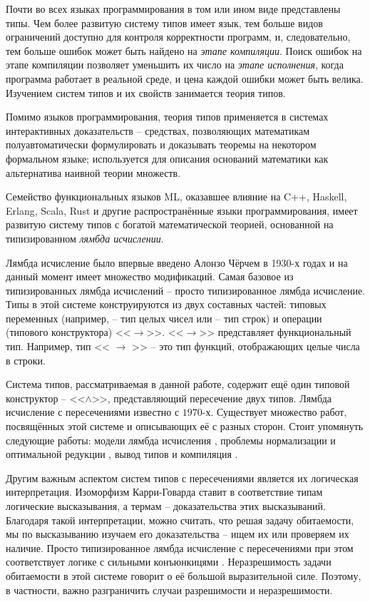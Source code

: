 \documentclass[../main.tex]{subfiles}
\begin{document}
 \label{sec:introduction}

Почти во всех языках программирования в том или ином виде представлены типы. Чем более развитую систему типов имеет язык, тем больше видов ограничений доступно для контроля корректности программ, и, следовательно, тем больше ошибок может быть найдено на {\it этапе компиляции}. Поиск ошибок на этапе компиляции позволяет уменьшить их число на {\it этапе исполнения}, когда программа работает в реальной среде, и цена каждой ошибки может быть велика. Изучением систем типов и их свойств занимается теория типов. 

Помимо языков программирования, теория типов применяется в системах интерактивных доказательств -- средствах, позволяющих математикам полуавтоматически формулировать и доказывать теоремы на некотором формальном языке; используется для описания оснований математики как альтернатива наивной теории множеств.

\emptyline

Семейство функциональных языков ML, оказавшее влияние на C++, Haskell, Erlang, Scala, Rust и другие распространённые языки программирования, имеет развитую систему типов с богатой математической теорией, основанной на типизированном {\it лямбда исчислении}.

Лямбда исчисление было впервые введено Алонзо Чёрчем в 1930-х годах и на данный момент имеет множество модификаций. Самая базовое из типизированных лямбда исчислений -- просто типизированное лямбда исчисление. Типы в этой системе конструируются из двух составных частей: типовых переменных (например,  -- тип целых чисел или  -- тип строк) и операции (типового конструктора) <<$\to$>>. <<$\to$>> представляет функциональный тип. Например, тип << $\to$ >> -- это тип функций, отображающих целые числа в строки. 

Система типов, рассматриваемая в данной работе, содержит ещё один типовой конструктор -- <<$\wedge$>>, представляющий пересечение двух типов. Лямбда исчисление с пересечениями известно с $1970$-х. Существует множество работ, посвящённых этой системе и описывающих её с разных сторон. Стоит упомянуть следующие работы: модели лямбда исчисления \cite{alessi_2006, coppo_1980}, проблемы нормализации и оптимальной редукции \cite{neergaard_2004, pottinger_1980}, вывод типов и компиляция \cite{kfoury_2004, wells_2002}.

Другим важным аспектом систем типов с пересечениями является их логическая интерпретация. Изоморфизм Карри-Говарда ставит в соответствие типам логические высказывания, а термам -- доказательства этих высказываний. 
Благодаря такой интерпретации, можно считать, что решая задачу обитаемости, мы по высказыванию изучаем его доказательства -- ищем их или проверяем их наличие.
Просто типизированное лямбда исчисление с пересечениями при этом соответствует логике с сильными конъюнкицями \cite{lopez-escobar_1985, mints_1989}. Неразрешимость задачи обитаемости в этой системе \cite{urzyczyn_1999} говорит о её большой выразительной силе. Поэтому, в частности, важно разграничить случаи разрешимости и неразрешимости. 
\end{document}
